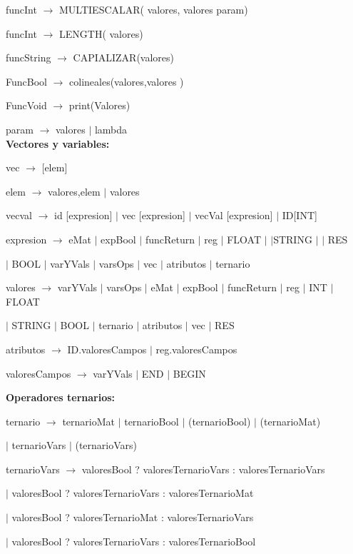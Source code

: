 funcInt $\rightarrow$ MULTIESCALAR( valores, valores param)

funcInt $\rightarrow$ LENGTH( valores)

funcString $\rightarrow$ CAPIALIZAR(valores)

FuncBool $\rightarrow$ colineales(valores,valores )

FuncVoid $\rightarrow$ print(Valores) 

param $\rightarrow$ valores $|$ lambda \\

\textbf{Vectores y variables:}

vec $\rightarrow$ [elem]

elem $\rightarrow$ valores,elem $|$ valores

vecval $\rightarrow$ id [expresion] $|$ vec [expresion] $|$ vecVal [expresion] $|$ ID[INT]

expresion $\rightarrow$ eMat
$|$  expBool
$|$  funcReturn
$|$  reg
$|$  FLOAT $|$
$|$STRING $|$
$|$  RES

\hspace{15mm}$|$   BOOL $|$  varYVals $|$  varsOps $|$  vec $|$  atributos $|$  ternario 
 
valores $\rightarrow$  varYVals
$|$  varsOps
$|$  eMat
$|$  expBool
$|$  funcReturn
$|$  reg
$|$  INT
$|$  FLOAT
  
  \hspace{15mm}$|$  STRING
  $|$  BOOL
  $|$  ternario
  $|$  atributos
  $|$  vec
  $|$  RES
 
atributos $\rightarrow$ ID.valoresCampos $|$ reg.valoresCampos

valoresCampos $\rightarrow$ varYVals $|$ END $|$ BEGIN

\textbf{Operadores ternarios:}

ternario $\rightarrow$ ternarioMat $|$ ternarioBool $|$ (ternarioBool) $|$ (ternarioMat) 

\hspace{15mm}$|$ ternarioVars  $|$ (ternarioVars)

ternarioVars $\rightarrow$ valoresBool ? valoresTernarioVars : valoresTernarioVars  

  \hspace{15mm}$|$  valoresBool ? valoresTernarioVars : valoresTernarioMat 
  
  \hspace{15mm}$|$  valoresBool ? valoresTernarioMat : valoresTernarioVars
  
  \hspace{15mm}$|$  valoresBool ? valoresTernarioVars : valoresTernarioBool 
  
